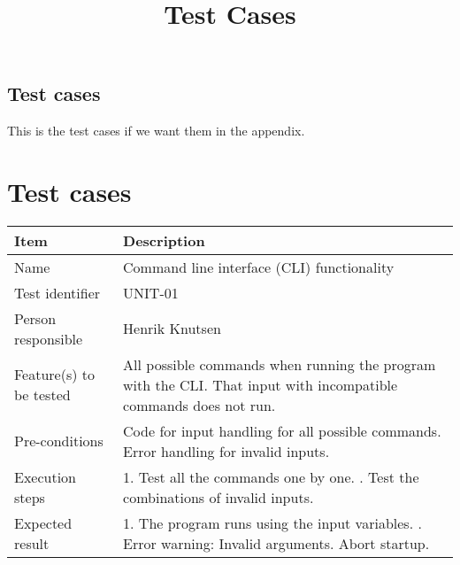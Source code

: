 \documentclass[12pt, fullpage, oneside]{report}
\begin{document}
\title{Test Cases}

	\subsection*{Test cases}
		This is the test cases if we want them in the appendix.
	\setcounter{tocdepth}{1}

	\section{Test cases}
		\vspace{8 mm}		

		\begin{center}
			\begin{tabular}{ |  p{3.5cm} | p{10cm} | }
				\hline
				Item & Description \\ [5pt] \hline \hline
				Name & Command line interface (CLI) functionality \\  [5pt] \hline
				Test identifier & UNIT-01 \\  [5pt] \hline
				Person responsible & Henrik Knutsen \\  [5pt] \hline
				Feature(s) to be tested & All possible commands when running the program with the CLI. That input with incompatible commands does not run. \\  [5pt] \hline
				Pre-conditions & Code for input handling for all possible commands. Error handling for invalid inputs. \\  [5pt] \hline
				Execution steps & 1. Test all the commands one by one. \newline 2. Test the combinations of invalid inputs. \\  [5pt] \hline
				Expected result & 1. The program runs using the input variables. \newline 2. Error warning: Invalid arguments. Abort startup. \\  [5pt] \hline
			\end{tabular}
		\end{center}
\end{document}
